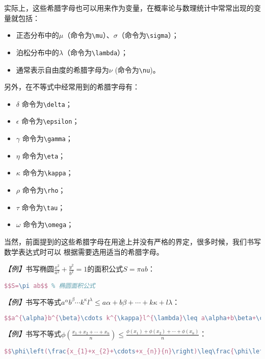 实际上，这些希腊字母也可以用来作为变量，在概率论与数理统计中常常出现的变量就包括：
\begin{itemize}
    \item 正态分布中的$\mu$（命令为\texttt{\textbackslash{}mu}）、$\sigma$（命令为\texttt{\textbackslash{}sigma}）；
    \item 泊松分布中的$\lambda$（命令为\texttt{\textbackslash{}lambda}）；
    \item 通常表示自由度的希腊字母为$\nu$ (命令为\texttt{\textbackslash{}nu})。
\end{itemize}

另外，在不等式中经常用到的希腊字母有：
\begin{itemize}
    \item $\delta$ 命令为\texttt{\textbackslash{}delta}；
    \item $\epsilon$ 命令为\texttt{\textbackslash{}epsilon}；
    \item $\gamma$ 命令为\texttt{\textbackslash{}gamma}；
    \item $\eta$ 命令为\texttt{\textbackslash{}eta}；
    \item $\kappa$ 命令为\texttt{\textbackslash{}kappa}；
    \item $\rho$ 命令为\texttt{\textbackslash{}rho}；
    \item $\tau$ 命令为\texttt{\textbackslash{}tau}；
    \item $\omega$ 命令为\texttt{\textbackslash{}omega}；
\end{itemize}

当然，前面提到的这些希腊字母在用途上并没有严格的界定，很多时候，我们书写数学表达式时可以
根据需要选用适当的希腊字母。

\emph{【例】}书写椭圆$\frac{x^2}{a^2} + \frac{y^2}{b^2} = 1$的面积公式$S=\pi ab$：
\begin{lstlisting}[language=TeX]
    $$S=\pi ab$$ % 椭圆面积公式
\end{lstlisting}

\emph{【例】}书写不等式$a^{\alpha}b^{\beta}\cdots k^{\kappa}l^{\lambda}\leq a\alpha+b\beta+\cdots+k\kappa+l\lambda$：
\begin{lstlisting}[language=TeX]
    $$a^{\alpha}b^{\beta}\cdots k^{\kappa}l^{\lambda}\leq a\alpha+b\beta+\cdots+k\kappa+l\lambda$$
\end{lstlisting}

\emph{【例】}书写不等式$\phi\left(\frac{x_{1}+x_{2}+\cdots+x_{n}}{n}\right)\leq\frac{\phi\left(x_{1}\right)+\phi\left(x_{2}\right)+\cdots+\phi\left(x_{n}\right)}{n}$：
\begin{lstlisting}[language=TeX]
    $$\phi\left(\frac{x_{1}+x_{2}+\cdots+x_{n}}{n}\right)\leq\frac{\phi\left(x_{1}\right)+\phi\left(x_{2}\right)+\cdots+\phi\left(x_{n}\right)}{n}$$
\end{lstlisting}

